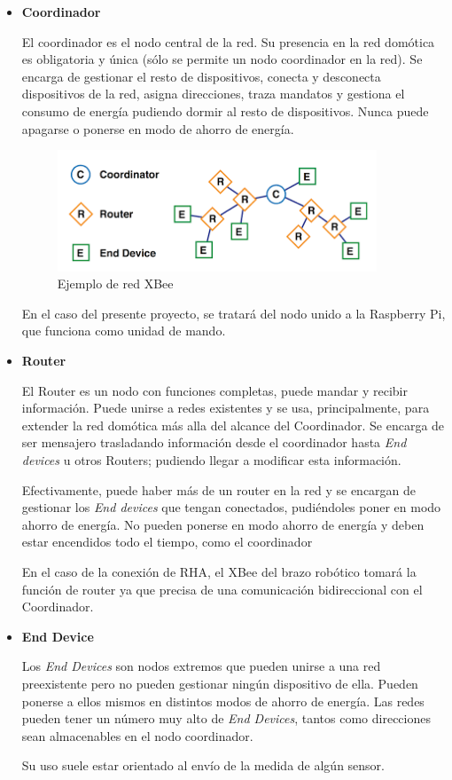 \begin{itemize}
\item \textbf{Coordinador}

El coordinador es el nodo central de la red. Su presencia en la red domótica es obligatoria y única (sólo se permite un nodo coordinador en la red). Se encarga de gestionar el resto de dispositivos, conecta y desconecta dispositivos de la red, asigna direcciones, traza mandatos y gestiona el consumo de energía pudiendo dormir al resto de dispositivos. Nunca puede apagarse o ponerse en modo de ahorro de energía.

\begin{figure}[t]
\centering
\includegraphics[width=0.9\textwidth]{figuras/XbeeRed.png}
\caption{Ejemplo de red XBee}
\label{fig:XbeeRed}
\end{figure}

En el caso del presente proyecto, se tratará del nodo unido a la Raspberry Pi, que funciona como unidad de mando.

\item \textbf{Router}

El Router es un nodo con funciones completas, puede mandar y recibir información. Puede unirse a redes existentes y se usa, principalmente, para extender la red domótica más alla del alcance del Coordinador. Se encarga de ser mensajero trasladando información desde el coordinador hasta \textit{End devices} u otros Routers; pudiendo llegar a modificar esta información.

Efectivamente, puede haber más de un router en la red y se encargan de gestionar los \textit{End devices} que tengan conectados, pudiéndoles poner en modo ahorro de energía. No pueden ponerse en modo ahorro de energía y deben estar encendidos todo el tiempo, como el coordinador

En el caso de la conexión de RHA, el XBee del brazo robótico tomará la función de router ya que precisa de una comunicación bidireccional con el Coordinador.

\item \textbf{End Device}

Los \textit{End Devices} son nodos extremos que pueden unirse a una red preexistente pero no pueden gestionar ningún dispositivo de ella. Pueden ponerse a ellos mismos en distintos modos de ahorro de energía. Las redes pueden tener un número muy alto de \textit{End Devices}, tantos como direcciones sean almacenables en el nodo coordinador.

Su uso suele estar orientado al envío de la medida de algún sensor.

\end{itemize}



